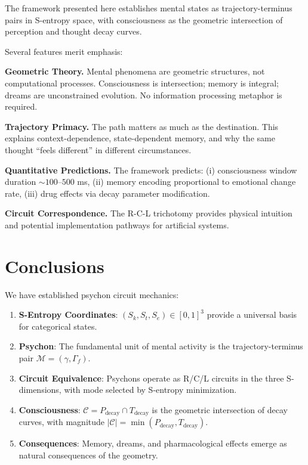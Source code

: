 \documentclass[twocolumn,amsmath,amssymb,aps,prl,superscriptaddress]{revtex4-2}
\newcommand{\Sk}{S_k}
\newcommand{\St}{S_t}
\newcommand{\Se}{S_e}
\newcommand{\Mstate}{\mathcal{M}}
\newcommand{\Ccat}{\mathcal{C}}
\newcommand{\Pdecay}{P_{\text{decay}}}
\newcommand{\Tdecay}{T_{\text{decay}}}
\newcommand{\Gstate}{\Gamma}
\newcommand{\traj}{\gamma}
\begin{document}
The framework presented here establishes mental states as trajectory-terminus pairs in S-entropy space, with consciousness as the geometric intersection of perception and thought decay curves.

Several features merit emphasis:

\textbf{Geometric Theory.} Mental phenomena are geometric structures, not computational processes. Consciousness is intersection; memory is integral; dreams are unconstrained evolution. No information processing metaphor is required.

\textbf{Trajectory Primacy.} The path matters as much as the destination. This explains context-dependence, state-dependent memory, and why the same thought ``feels different'' in different circumstances.

\textbf{Quantitative Predictions.} The framework predicts: (i) consciousness window duration $\sim 100$--$500$ ms, (ii) memory encoding proportional to emotional change rate, (iii) drug effects via decay parameter modification.

\textbf{Circuit Correspondence.} The R-C-L trichotomy provides physical intuition and potential implementation pathways for artificial systems.

\section{Conclusions}

We have established psychon circuit mechanics:

\begin{enumerate}
\item \textbf{S-Entropy Coordinates}: $(\Sk, \St, \Se) \in [0,1]^3$ provide a universal basis for categorical states.

\item \textbf{Psychon}: The fundamental unit of mental activity is the trajectory-terminus pair $\Mstate = (\traj, \Gstate_f)$.

\item \textbf{Circuit Equivalence}: Psychons operate as R/C/L circuits in the three S-dimensions, with mode selected by S-entropy minimization.

\item \textbf{Consciousness}: $\Ccat = \Pdecay \cap \Tdecay$ is the geometric intersection of decay curves, with magnitude $|\Ccat| = \min(\Pdecay, \Tdecay)$.

\item \textbf{Consequences}: Memory, dreams, and pharmacological effects emerge as natural consequences of the geometry.
\end{enumerate}
\end{document}

